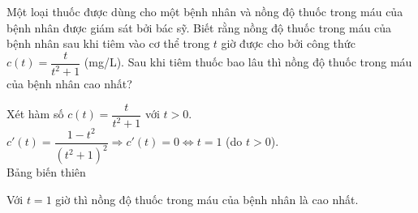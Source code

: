 \begin{ex}%
Một loại thuốc được dùng cho một bệnh nhân và nồng độ thuốc trong máu của bệnh nhân được giám sát bởi bác sỹ. Biết rằng nồng độ thuốc trong máu của bệnh nhân sau khi tiêm vào cơ thể trong $t$ giờ được cho bởi công thức $c \left(t \right) = \dfrac{t}{t^2+1}$ (mg/L). Sau khi tiêm thuốc bao lâu thì nồng độ thuốc trong máu của bệnh nhân cao nhất? 
\loigiai
{
Xét hàm số $c \left(t \right) = \dfrac{t}{t^2+1}$ với $t >0$. \\
$c' \left(t\right) = \dfrac{1 - t^2}{\left(t^2 +1\right)^2} \Rightarrow c' \left(t\right) =0 \Leftrightarrow t =1$ (do $t>0$). \\
Bảng biến thiên 
\begin{center}
\end{center}
Với $t=1$ giờ thì nồng độ thuốc trong máu của bệnh nhân là cao nhất. 
}
\end{ex}

